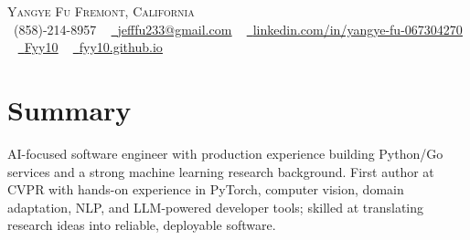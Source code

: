 \documentclass[letterpaper,11pt]{article}
\begin{document}

\begin{center}
    {\Huge \scshape Yangye Fu \upshape\small\faMapMarker* Fremont, California} \\ \vspace{1pt}
    \small \raisebox{-0.1\height}\faPhone\ (858)-214-8957 ~
    \href{mailto:jefffu233@gmail.com}{\raisebox{-0.2\height}\faEnvelope\ \underline{jefffu233@gmail.com}} ~
    \href{https://www.linkedin.com/in/yangye-fu-067304270/}{\raisebox{-0.2\height}\faLinkedin\ \underline{linkedin.com/in/yangye-fu-067304270}} ~
    \href{https://github.com/Fyy10}{\raisebox{-0.2\height}\faGithub\ \underline{Fyy10}} ~
    \href{https://fyy10.github.io}{\raisebox{-0.2\height}\faHome\ \underline{fyy10.github.io}}
    \vspace{-8pt}
\end{center}

\section{Summary}
\small{AI-focused software engineer with production experience building Python/Go services and a strong machine learning research background. First author at CVPR with hands-on experience in PyTorch, computer vision, domain adaptation, NLP, and LLM-powered developer tools; skilled at translating research ideas into reliable, deployable software.}
\vspace{-8pt}


\end{document}
